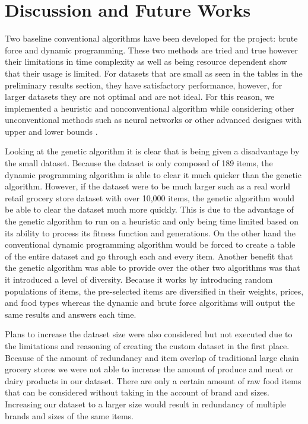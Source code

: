 \documentclass[10pt,journal,compsoc]{IEEEtran}
\begin{document}
\section{Discussion and Future Works}
Two baseline conventional algorithms have been developed for the project: brute
force and dynamic programming. These two methods are tried and true however
their limitations in time complexity as well as being resource dependent show
that their usage is limited. For datasets that are small as seen in the tables
in the preliminary results section, they have satisfactory performance, however,
for larger datasets they are not optimal and are not ideal. For this reason, we
implemented a heuristic and nonconventional algorithm while considering other
unconventional methods such as neural networks or other advanced designes with
upper and lower bounds\cite{nomer_neural_2020} \cite{mansi_hybrid_2013}.

Looking at the genetic algorithm it is clear that is being given a disadvantage
by the small dataset. Because the dataset is only composed of 189 items, the
dynamic programming algorithm is able to clear it much quicker than the genetic
algorithm. However, if the dataset were to be much larger such as a real world
retail grocery store dataset with over 10,000 items, the genetic algorithm would
be able to clear the dataset much more quickly. This is due to the advantage of
the genetic algorithm to run on a heuristic and only being time limited based on
its ability to process its fitness function and generations. On the other hand
the conventional dynamic programming algorithm would be forced to create a table
of the entire dataset and go through each and every item. Another benefit that
the genetic algorithm was able to provide over the other two algorithms was that
it introduced a level of diversity. Because it works by introducing random
populations of items, the pre-selected items are diversified in their weights,
prices, and food types whereas the dynamic and brute force algorithms will
output the same results and answers each time. 

Plans to increase the dataset size were also considered but not executed due to
the limitations and reasoning of creating the custom dataset in the first place.
Because of the amount of redundancy and item overlap of traditional large chain
grocery stores we were not able to increase the amount of produce and meat or
dairy products in our dataset. There are only a certain amount of raw food items
that can be considered without taking in the account of brand and sizes.
Increasing our dataset to a larger size would result in redundancy of multiple
brands and sizes of the same items.
\end{document}
